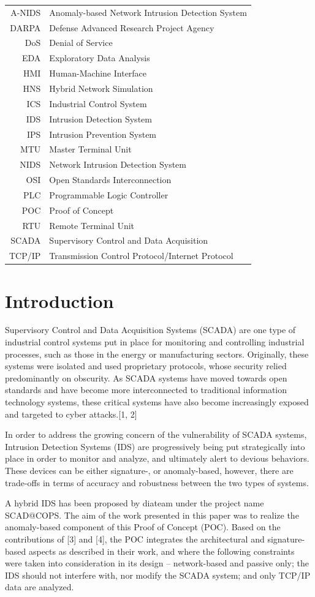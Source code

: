 \documentclass[11pt,a4paper]{article}
\begin{document}
\begin{longtable}[c]{@{}rl@{}}
\toprule
A-NIDS & Anomaly-based Network Intrusion Detection System\tabularnewline
DARPA & Defense Advanced Research Project Agency\tabularnewline
DoS & Denial of Service\tabularnewline
EDA & Exploratory Data Analysis\tabularnewline
HMI & Human-Machine Interface\tabularnewline
HNS & Hybrid Network Simulation\tabularnewline
ICS & Industrial Control System\tabularnewline
IDS & Intrusion Detection System\tabularnewline
IPS & Intrusion Prevention System\tabularnewline
MTU & Master Terminal Unit\tabularnewline
NIDS & Network Intrusion Detection System\tabularnewline
OSI & Open Standards Interconnection\tabularnewline
PLC & Programmable Logic Controller\tabularnewline
POC & Proof of Concept\tabularnewline
RTU & Remote Terminal Unit\tabularnewline
SCADA & Supervisory Control and Data Acquisition\tabularnewline
TCP/IP & Transmission Control Protocol/Internet Protocol\tabularnewline
\bottomrule
\end{longtable}

\newpage
\mbox{} \thispagestyle{empty}

\clearpage
{}

\setcounter{page}{17}

\section{Introduction}\label{introduction}

Supervisory Control and Data Acquisition Systems (SCADA) are one type of
industrial control systems put in place for monitoring and controlling
industrial processes, such as those in the energy or manufacturing
sectors. Originally, these systems were isolated and used proprietary
protocols, whose security relied predominantly on obscurity. As SCADA
systems have moved towards open standards and have become more
interconnected to traditional information technology systems, these
critical systems have also become increasingly exposed and targeted to
cyber attacks.{[}1, 2{]}

In order to address the growing concern of the vulnerability of SCADA
systems, Intrusion Detection Systems (IDS) are progressively being put
strategically into place in order to monitor and analyze, and ultimately
alert to devious behaviors. These devices can be either signature-, or
anomaly-based, however, there are trade-offs in terms of accuracy and
robustness between the two types of systems.

A hybrid IDS has been proposed by diateam under the project name
SCAD@COPS. The aim of the work presented in this paper was to realize
the anomaly-based component of this Proof of Concept (POC). Based on the
contributions of {[}3{]} and {[}4{]}, the POC integrates the
architectural and signature-based aspects as described in their work,
and where the following constraints were taken into consideration in its
design -- network-based and passive only; the IDS should not interfere
with, nor modify the SCADA system; and only TCP/IP data are analyzed.
\end{document}
